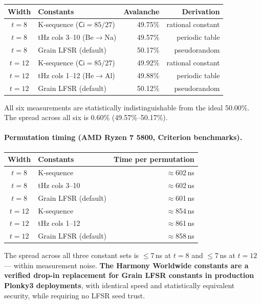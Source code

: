 \documentclass[preprint]{iacrtrans}
\newcommand{\Ci}{\ensuremath{\mathsf{Ci}}}
\begin{document}
\begin{center}
\begin{tabular}{clrr}
\toprule
Width & Constants & Avalanche & Derivation \\
\midrule
$t=8$  & K-sequence ($\Ci=85/27$) & 49.75\% & rational constant \\
$t=8$  & tHz cols 3--10 (Be$\to$Na) & 49.57\% & periodic table \\
$t=8$  & Grain LFSR (default) & 50.17\% & pseudorandom \\
\midrule
$t=12$ & K-sequence ($\Ci=85/27$) & 49.92\% & rational constant \\
$t=12$ & tHz cols 1--12 (He$\to$Al) & 49.88\% & periodic table \\
$t=12$ & Grain LFSR (default) & 50.12\% & pseudorandom \\
\bottomrule
\end{tabular}
\end{center}

All six measurements are statistically indistinguishable from the ideal
50.00\%. The spread across all six is 0.60\% (49.57\%--50.17\%).

\paragraph{Permutation timing (AMD Ryzen 7 5800, Criterion benchmarks).}

\begin{center}
\begin{tabular}{clr}
\toprule
Width & Constants & Time per permutation \\
\midrule
$t=8$  & K-sequence & $\approx$602\,ns \\
$t=8$  & tHz cols 3--10 & $\approx$602\,ns \\
$t=8$  & Grain LFSR (default) & $\approx$601\,ns \\
\midrule
$t=12$ & K-sequence & $\approx$854\,ns \\
$t=12$ & tHz cols 1--12 & $\approx$861\,ns \\
$t=12$ & Grain LFSR (default) & $\approx$858\,ns \\
\bottomrule
\end{tabular}
\end{center}

The spread across all three constant sets is $\leq$7\,ns at $t=8$ and
$\leq$7\,ns at $t=12$ — within measurement noise. \textbf{The Harmony
Worldwide constants are a verified drop-in replacement for Grain LFSR
constants in production Plonky3 deployments}, with identical speed and
statistically equivalent security, while requiring no LFSR seed trust.
\end{document}
